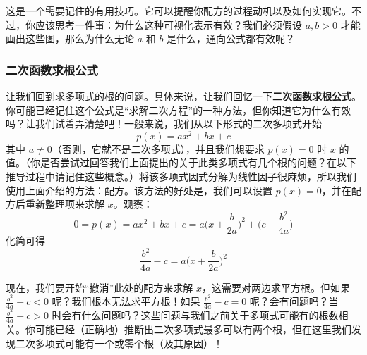 这是一个需要记住的有用技巧。它可以提醒你配方的过程动机以及如何实现它。不过，你应该思考一件事：为什么这种可视化表示有效？我们必须假设 $a, b > 0$ 才能画出这些图，那么为什么无论 $a$ 和 $b$ 是什么，通向公式都有效呢？

\subsubsection*{二次函数求根公式}

让我们回到求多项式的根的问题。具体来说，让我们回忆一下\textbf{二次函数求根公式}。你可能已经记住这个公式是``求解二次方程''的一种方法，但你知道它为什么有效吗？让我们试着弄清楚吧！一般来说，我们从以下形式的二次多项式开始
\[p(x) = ax^2 + bx + c\]
其中 $a \ne 0$（否则，它就不是二次多项式），并且我们想要求 $p(x) = 0$ 时 $x$ 的值。（你是否尝试过回答我们上面提出的关于此类多项式有几个根的问题？在以下推导过程中请记住这些概念。）将该多项式因式分解为线性因子很麻烦，所以我们使用上面介绍的方法：配方。该方法的好处是，我们可以设置 $p(x)=0$，并在配方后重新整理项来求解 $x$。观察：
\[0 = p(x) = ax^2 + bx + c =a\Big(x+\frac{b}{2a}\Big)^2+\Big(c- \frac{b^2}{4a}\Big)\]
化简可得
\[\frac{b^2}{4a} -c = a\Big(x+\frac{b}{2a}\Big)^2\]

现在，我们要开始``撤消''此处的配方来求解 $x$，这需要对两边求平方根。但如果 $\frac{b^2}{4a} -c < 0$ 呢？我们根本无法求平方根！如果 $\frac{b^2}{4a} -c = 0$ 呢？会有问题吗？当 $\frac{b^2}{4a} -c > 0$ 时会有什么问题吗？这些问题与我们之前关于多项式可能有的根数相关。你可能已经（正确地）推断出二次多项式最多可以有两个根，但在这里我们发现二次多项式可能有一个或零个根（及其原因）！

